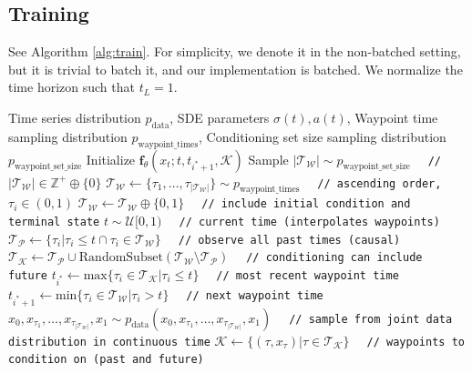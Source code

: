 \documentclass{article}
\begin{document}
\subsection{Training}
See Algorithm \ref{alg:train}. For simplicity, we denote it in the non-batched setting, but it is trivial to batch it, and our implementation is batched. We normalize the time horizon such that $t_L = 1$.

\begin{algorithm}
\caption{Training Procedure}\label{alg:train}
\begin{algorithmic}[1]
\Require Time series distribution $p_\text{data}$, SDE parameters $\sigma(t), a(t)$, Waypoint time sampling distribution $p_\text{waypoint\_times}$, Conditioning set size sampling distribution $p_\text{waypoint\_set\_size}$
\State Initialize $\mathbf{f}_\theta(x_t; t, t_{i^*+1}, \mathcal{K})$
    \State Sample $|\mathcal{T_W}| \sim p_\text{waypoint\_set\_size}$ \texttt{\ \ //} $|\mathcal{T_W}| \in \mathbb{Z}^{+} \oplus \{0\}$
    \State $\mathcal{T_W} \gets \{\tau_1, \ldots, \tau_{|\mathcal{T_W}|}\} \sim p_\text{waypoint\_times}$ \texttt{\ \ // ascending order,} $\tau_i \in (0, 1)$
    \State $\mathcal{T_W} \gets \mathcal{T_W} \oplus \{0, 1\}$ \texttt{\ \ // include initial condition and terminal state}
    \State $t \sim \mathcal{U}[0, 1)$ \texttt{\ \ // current time (interpolates waypoints)}
    \State $\mathcal{T_P} \gets \{\tau_i | \tau_i \leq t \cap \tau_i \in \mathcal{T_W}\}$ \texttt{\ \ // observe all past times (causal)}
    \State $\mathcal{T_K} \gets \mathcal{T_P} \cup \text{RandomSubset}(\mathcal{T_W} \setminus \mathcal{T_P})$ \texttt{\ \ // conditioning can include future}
    \State $t_{i^{*}} \gets \text{max}\{\tau_i \in \mathcal{T_K} | \tau_i \leq t\}$ \texttt{\ \ // most recent waypoint time}
    \State $t_{i^{*} + 1} \gets \text{min}\{\tau_i \in \mathcal{T_W} | \tau_i > t\}$ \texttt{\ \ // next waypoint time}
    \State $x_0, x_{\tau_1}, \ldots, x_{\tau_{\left|\mathcal{T_W}\right|}}, x_1 \sim p_\text{data}\left(x_0, x_{\tau_1}, \ldots, x_{\tau_{\left|\mathcal{T_W}\right|}}, x_1\right)$ \texttt{\ \ // sample from joint data distribution in continuous time}
    \State $\mathcal{K} \gets \{(\tau, x_{\tau}) | \tau \in \mathcal{T_K}\}$ \texttt{\ \ // waypoints to condition on (past and future)}

\end{algorithmic}
\end{algorithm}
\end{document}
